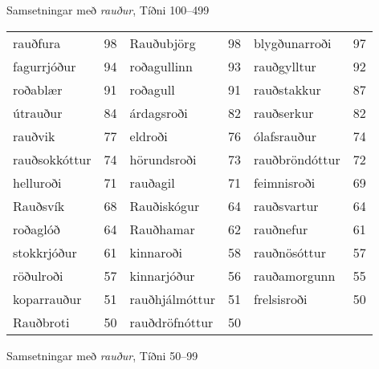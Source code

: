 \documentclass[../samsetningasafn.tex]{subfiles}
\begin{document}
\begin{wordlist}[H]
\begin{tcolorbox}
\begin{footnotesize}
\end{footnotesize}
\end{tcolorbox}
	\caption{Samsetningar með \textit{rauður}, Tíðni 100--499}
	\label{listi:rautt.100}
\end{wordlist}					

\begin{wordlist}[H]
\begin{tcolorbox}

	\setlength{\extrarowheight}{3pt}
	\begin{tabular}{BlBlBl}
		rauðfura		& 98		& 	
		Rauðubjörg	& 98		& 	
		blygðunarroði & 97		\\ 	
		fagurrjóður	& 94		& 	
		roðagullinn	& 93		& 	
		rauðgylltur	& 92		\\ 	
		roðablær	& 91		& 	
		roðagull		& 91		& 	
		rauðstakkur	& 87		\\ 
		útrauður		& 84		& 	
		árdagsroði	& 82		& 	
		rauðserkur	& 82		\\ 	
		rauðvik		& 77		& 	
		eldroði		& 76		& 	
		ólafsrauður	& 74		\\ 	
		rauðsokkóttur & 74		& 
		hörundsroði	& 73		& 
		rauðbröndóttur & 72		\\ 	
		helluroði		& 71		& 
		rauðagil		& 71		& 
		feimnisroði	& 69		\\ 	
		Rauðsvík		& 68		& 
		Rauðiskógur	& 64		& 
		rauðsvartur	& 64		\\ 	
		roðaglóð		& 64		& 	
		Rauðhamar	& 62		& 
		rauðnefur	& 61		\\ 	
		stokkrjóður	& 61		& 	
		kinnaroði	& 58		& 
		rauðnösóttur & 57		\\  	
		röðulroði	& 57		& 
		kinnarjóður	& 56		& 	
		rauðamorgunn	& 55	\\ 
		koparrauður	& 51		& 
		rauðhjálmóttur & 51		& 	
		frelsisroði	& 50		\\ 
		Rauðbroti	& 50		& 
		rauðdröfnóttur & 50		& 	
					& 
	\end{tabular}

\end{tcolorbox}
	\caption{Samsetningar með \textit{rauður}, Tíðni 50--99}
	\label{listi:rautt.50}
\end{wordlist}
\end{document}
